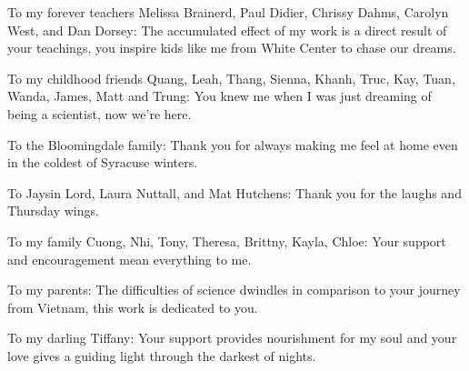 	To my forever teachers Melissa Brainerd, Paul Didier, Chrissy Dahms, Carolyn West, and Dan Dorsey:  The accumulated effect of my work is a direct result of your teachings, you inspire kids like me from White Center to chase our dreams.
	
	To my childhood friends Quang, Leah, Thang, Sienna, Khanh, Truc, Kay, Tuan, Wanda, James, Matt and Trung:  You knew me when I was just dreaming of being a scientist, now we're here.
	
	To the Bloomingdale family: Thank you for always making me feel at home even in the coldest of Syracuse winters.
	
	To Jaysin Lord, Laura Nuttall, and Mat Hutchens: Thank you for the laughs and Thursday wings.
	
	To my family Cuong, Nhi, Tony, Theresa, Brittny, Kayla, Chloe: Your support and encouragement mean everything to me.
	
	To my parents: The difficulties of science dwindles in comparison to your journey from Vietnam, this work is dedicated to you.
	
	To my darling Tiffany: Your support provides nourishment for my soul and your love gives a guiding light through the darkest of nights.